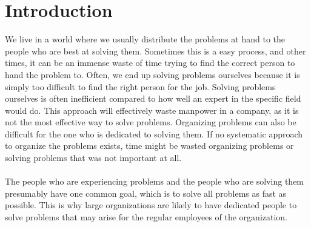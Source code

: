 \chapter{Introduction}
\label{sec:introduction}





We live in a world where we usually distribute the problems at hand to the people who are best at solving them. Sometimes this is a easy process, and other times, it can be an immense waste of time trying to find the correct person to hand the problem to. Often, we end up solving problems ourselves because it is simply too difficult to find the right person for the job. Solving problems ourselves is often inefficient compared to how well an expert in the specific field would do. This approach will effectively waste manpower in a company, as it is not the most effective way to solve problems.
Organizing problems can also be difficult for the one who is dedicated to solving them. If no systematic approach to organize the problems exists, time might be wasted organizing problems or solving problems that was not important at all.\\
\ \\
The people who are experiencing problems and the people who are solving them presumably have one common goal, which is to solve all problems as fast as possible. This is why large organizations are likely to have dedicated people to solve problems that may arise for the regular employees of the organization.


